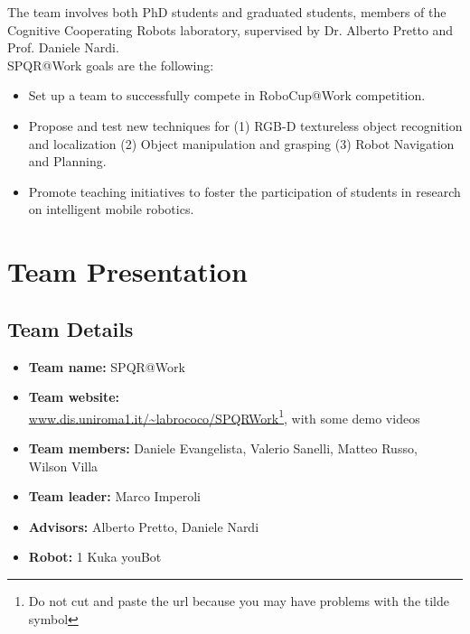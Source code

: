 \documentclass{llncs}
\begin{document}
The team involves both PhD students and graduated students, members of the Cognitive Cooperating Robots laboratory, supervised by Dr. Alberto Pretto and Prof. Daniele Nardi.\\ 

SPQR@Work goals are the following:
\begin{itemize}
 \item Set up a team to successfully compete in RoboCup@Work competition.
 \item Propose and test new techniques for (1) RGB-D textureless object recognition and localization (2) Object manipulation and grasping (3) Robot Navigation and Planning.
 \item Promote teaching initiatives to foster the participation of students in research on intelligent mobile robotics.
\end{itemize}
 
\section{Team Presentation}
\subsection{Team Details}

\begin{itemize}
 \item \textbf{Team name:} SPQR@Work
 \item \textbf{Team website:} \\\url{www.dis.uniroma1.it/~labrococo/SPQRWork}\footnote{Do not cut and paste the url because you may have problems with the tilde symbol}, with some demo videos
 \item \textbf{Team members:} Daniele Evangelista, Valerio Sanelli, Matteo Russo,\\ Wilson Villa
  \item \textbf{Team leader:} Marco Imperoli
 \item \textbf{Advisors:} Alberto Pretto, Daniele Nardi
 \item \textbf{Robot:} 1 Kuka youBot
\end{itemize}
\end{document}
